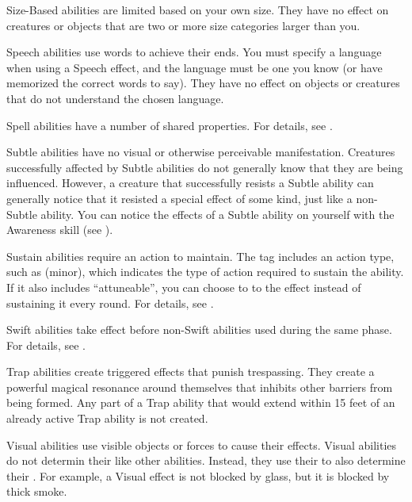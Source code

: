    Size-Based abilities are limited based on your own size.
  They have no effect on creatures or objects that are two or more size categories larger than you.

   Speech abilities use words to achieve their ends.
  You must specify a language when using a Speech effect, and the language must be one you know (or have memorized the correct words to say). They have no effect on objects or creatures that do not understand the chosen language.

   Spell abilities have a number of shared properties.
  For details, see .

   Subtle abilities have no visual or otherwise perceivable manifestation.
  Creatures successfully affected by Subtle abilities do not generally know that they are being influenced.
  However, a creature that successfully resists a Subtle ability can generally notice that it resisted a special effect of some kind, just like a non-Subtle ability.
  You can notice the effects of a Subtle ability on yourself with the Awareness skill (see ).

   Sustain abilities require an action to maintain.
  The tag includes an action type, such as (minor), which indicates the type of action required to sustain the ability.
  If it also includes ``attuneable'', you can choose to  to the effect instead of sustaining it every round.
  For details, see .

   Swift abilities take effect before non-Swift abilities used during the same phase.
  For details, see .

   Trap abilities create triggered effects that punish trespassing.
  They create a powerful magical resonance around themselves that inhibits other barriers from being formed.
  Any part of a Trap ability that would extend within 15 feet of an already active Trap ability is not created.

   Visual abilities use visible objects or forces to cause their effects.
  Visual abilities do not determin their  like other abilities.
  Instead, they use their  to also determine their .
  For example, a Visual effect is not blocked by glass, but it is blocked by thick smoke.

